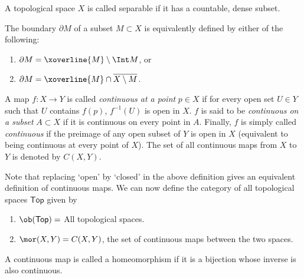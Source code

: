 \begin{defn}
    A topological space $X$ is called separable if it has a countable, dense subset.
\end{defn}

\begin{defn}[Boundary]
    The boundary $\partial M$ of a subset $M\subset X$ is equivalently defined by either of the following:
    \begin{enumerate}
        \item $\partial M = \xoverline{M} \setminus \Int M$, or
        \item $\partial M = \xoverline{M} \cap \overline{X\setminus M}$.
    \end{enumerate}
\end{defn}

\begin{defn}
    A map $f:X\rightarrow Y$ is called \emph{continuous at a point} $p\in X$ if for every open set $U\in Y$ such that $U$ contains $f(p)$, $f^{-1}(U)$ is open in $X$. $f$ is said to be \emph{continuous on a subset} $A\subset X$ if it is continuous on every point in $A$. Finally, $f$ is simply called \emph{continuous} if the preimage of any open subset of $Y$ is open in $X$ (equivalent to being continuous at every point of $X$). The set of all continuous maps from $X$ to $Y$ is denoted by $C(X,Y)$.
\end{defn}

Note that replacing `open' by `closed' in the above definition gives an equivalent definition of continuous maps.  We can now define the category of all topological spaces $\mathsf{Top}$ given by
\begin{enumerate}
    \item $\ob(\mathsf{Top})=$ All topological spaces.
    \item $\mor(X,Y) = C(X,Y)$, the set of continuous maps between the two spaces.
\end{enumerate}

\begin{defn}[Homeomorphism]
    A continuous map is called a homeomorphism if it is a bijection whose inverse is also continuous.
\end{defn}

